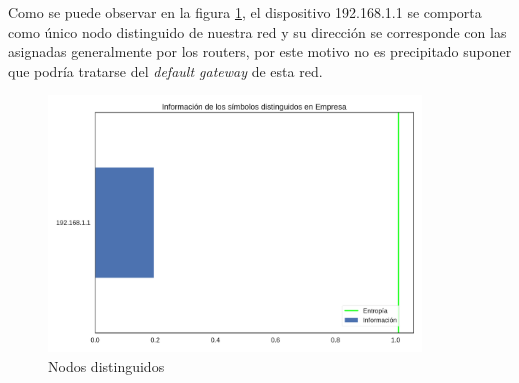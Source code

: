  Como se puede observar en la figura \ref{fig:distinguidos-empresa}, el dispositivo 192.168.1.1 se comporta como único nodo distinguido de nuestra red y su dirección se corresponde con las asignadas generalmente por los routers, por este motivo no es precipitado suponer que podría tratarse del \emph{default gateway} de esta red.

\begin{figure}[H]
   \centering
       \includegraphics[page=1, height=6.8cm ,width=\textwidth]{../img/distinguidos-Empresa}
 \caption{Nodos distinguidos}
 \label{fig:distinguidos-empresa}
\end{figure}


